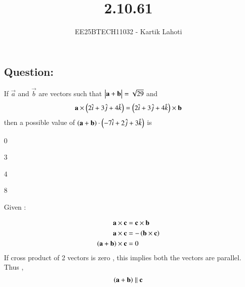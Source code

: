 \documentclass[journal]{IEEEtran}
\numberwithin{equation}{enumi}
\numberwithin{figure}{enumi}
\begin{document}

\vspace{3cm}

\title{2.10.61}
\author{EE25BTECH11032 - Kartik Lahoti}
\maketitle

\subsection*{Question: } 
If $\vec{a}$ and $\vec{b}$ are vectors such that $\begin{vmatrix}\mathbf{a} + \mathbf{b}\end{vmatrix} = \sqrt{29}$ and
\begin{align*}
    \mathbf{a} \times \left(2\hat{i} + 3\hat{j} + 4\hat{k}\right) = \left(2\hat{i} + 3\hat{j} + 4\hat{k}\right) \times \mathbf{b}
\end{align*}
then a possible value of $\left(\mathbf{a}+\mathbf{b}\right)\cdot\left(-7\hat{i} + 2\hat{j} + 3\hat{k}\right)$ is 
\begin{enumerate}
    \begin{multicols}{4}
    \item 0
    \item 3
    \item 4
    \item 8
    \end{multicols}
\end{enumerate}
\solution 

Given : 
\begin{table}[H]
    \centering
    
    \caption*{}
    \label{tab:placeholder_1}
\end{table}
\begin{align}
    \mathbf{a} \times \mathbf{c} &= \mathbf{c} \times \mathbf{b}\\
    \mathbf{a} \times \mathbf{c} &= - \left(\mathbf{b} \times \mathbf{c}\right) \\
    \left(\mathbf{a} + \mathbf{b}\right) \times \mathbf{c} &= 0  
\end{align}
If cross product of 2 vectors is zero ,  this implies both the vectors are parallel. 
Thus , 
\begin{align}
    \left(\mathbf{a} + \mathbf{b}\right) \parallel \mathbf{c} 
\end{align}
\end{document}
